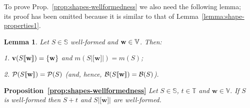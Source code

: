 \documentclass[11pt]{article}
\newcommand{\lsbrace}{\ensuremath{|\![}}
\newcommand{\rsbrace}{\ensuremath{]\!|}}
\newcommand{\shapes}{\mathbb{S}}
\newcommand{\vect}[1]{\mathbf{#1}}
\newcommand{\vel}{{\mathbb V}}
\newcommand{\boundary}[1]{\ensuremath{{\cal B}(#1)}}
\newcommand{\points}[1]{\ensuremath{{\cal P}(#1)}}
\newcommand{\velocity}[1]{{\bf v}(#1)}
\newcommand{\mass}[1]{m(#1)}
\newcommand{\timedomain}{{\mathbb T}}
\newtheorem{lemma}{Lemma}
\begin{document}
\par\medskip\noindent
To prove Prop.~\ref{prop:shapes-wellformedness} we also need the following lemma; its proof has been
omitted because it is similar to that of Lemma~\ref{lemma:shape-properties1}.
\begin{lemma}\label{lemma:shape-properties2}
Let $S \in \shapes$ well-formed and ${\bf w} \in \vel$. Then:

1. $\velocity{S\lsbrace\vect{w}\rsbrace} =\{\vect{w}\}$ and $\mass{S\lsbrace\vect{w}\rsbrace} =
\mass{S}$;

2. $\points{S\lsbrace\vect{w}\rsbrace} = \points{S} $ (and, hence,
$\boundary{S\lsbrace\vect{w}\rsbrace} = \boundary{S}$).
\end{lemma}
\par\medskip\noindent
{\bf Proposition~\ref{prop:shapes-wellformedness}}
{\em Let $S \in \shapes$, $t\in \timedomain$ and $\vect{w}\in\vel$. If $S$ is well-formed then $S+t$
and $S\lsbrace\vect{w}\rsbrace$ are well-formed.}
\end{document}
